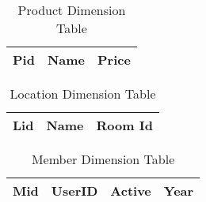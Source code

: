 \begin{table}[H]
    \centering
    \begin{tabular}{|l|l|l|}
        \hline
        Pid & Name & Price \\ \hline
    \end{tabular}
    \caption{Product Dimension Table}
    \label{tab:productDimensionTable}
\end{table}

\begin{table}[H]
    \centering
    \begin{tabular}{|l|l|l|}
        \hline
        Lid & Name & Room Id \\ \hline
    \end{tabular}
    \caption{Location Dimension Table}
    \label{tab:locationDimensionTable}
\end{table}

\begin{table}[H]
    \centering
    \begin{tabular}{|l|l|l|l|}
        \hline
        Mid & UserID & Active & Year \\ \hline
    \end{tabular}
    \caption{Member Dimension Table}
    \label{tab:memberDimensionTable}
\end{table}
